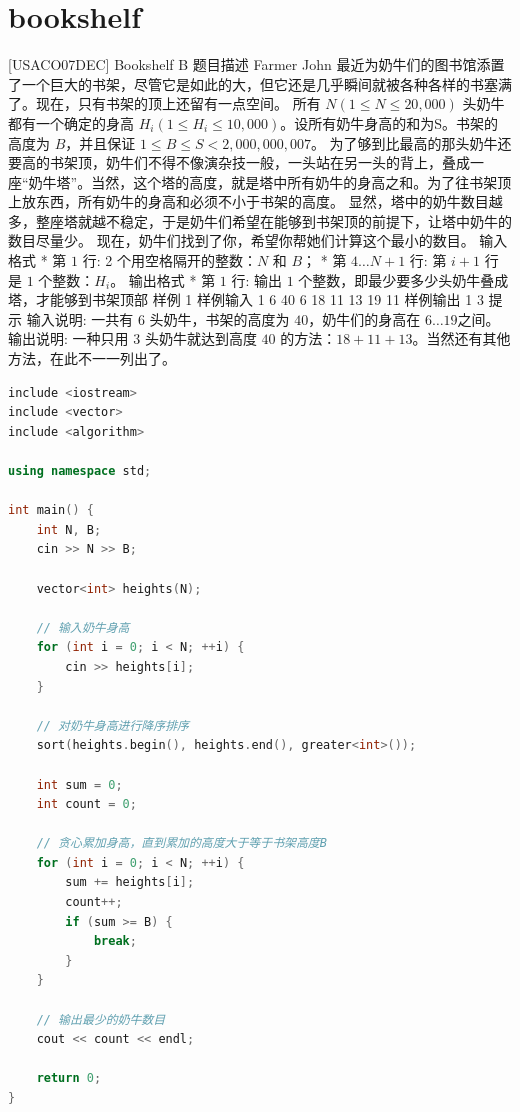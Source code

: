 \documentclass[12pt,twiside,a4paper]{ctexbook}
\numberwithin{chapter}{part}
\begin{document}
\section{bookshelf}
 [USACO07DEC] Bookshelf B
 题目描述
Farmer John 最近为奶牛们的图书馆添置了一个巨大的书架，尽管它是如此的大，但它还是几乎瞬间就被各种各样的书塞满了。现在，只有书架的顶上还留有一点空间。 
所有 $N(1 \le N \le 20,000)$ 头奶牛都有一个确定的身高 $H_i(1 \le H_i \le 10,000)$。设所有奶牛身高的和为S。书架的高度为 $B$，并且保证 $1 \le B \le S < 2,000,000,007$。 
为了够到比最高的那头奶牛还要高的书架顶，奶牛们不得不像演杂技一般，一头站在另一头的背上，叠成一座“奶牛塔”。当然，这个塔的高度，就是塔中所有奶牛的身高之和。为了往书架顶上放东西，所有奶牛的身高和必须不小于书架的高度。
显然，塔中的奶牛数目越多，整座塔就越不稳定，于是奶牛们希望在能够到书架顶的前提下，让塔中奶牛的数目尽量少。 现在，奶牛们找到了你，希望你帮她们计算这个最小的数目。
 输入格式
* 第 $1$ 行: 2 个用空格隔开的整数：$N$ 和 $B$；
* 第 $4\dots N+1$ 行: 第 $i+1$ 行是 $1$ 个整数：$H_i$。
 输出格式
* 第 $1$ 行: 输出 $1$ 个整数，即最少要多少头奶牛叠成塔，才能够到书架顶部
 样例 1
 样例输入 1
6 40
6
18
11
13
19
11
 样例输出 1
3
 提示
输入说明:
一共有 $6$ 头奶牛，书架的高度为 $40$，奶牛们的身高在 $6\dots19$之间。
输出说明:
一种只用 $3$ 头奶牛就达到高度 $40$ 的方法：$18+11+13$。当然还有其他方法，在此不一一列出了。
\begin{lstlisting}[language=c++,breaklines=true]
include <iostream>
include <vector>
include <algorithm>

using namespace std;

int main() {
    int N, B;
    cin >> N >> B;
    
    vector<int> heights(N);
    
    // 输入奶牛身高
    for (int i = 0; i < N; ++i) {
        cin >> heights[i];
    }
    
    // 对奶牛身高进行降序排序
    sort(heights.begin(), heights.end(), greater<int>());
    
    int sum = 0;
    int count = 0;
    
    // 贪心累加身高，直到累加的高度大于等于书架高度B
    for (int i = 0; i < N; ++i) {
        sum += heights[i];
        count++;
        if (sum >= B) {
            break;
        }
    }
    
    // 输出最少的奶牛数目
    cout << count << endl;
    
    return 0;
}
\end{lstlisting}
\end{document}
